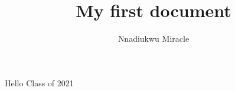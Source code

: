\documentclass{article}
\title{My first document}
\author{Nnadiukwu Miracle}
\begin{document}
	\maketitle
	\newpage
	Hello Class of 2021
\end{document}
